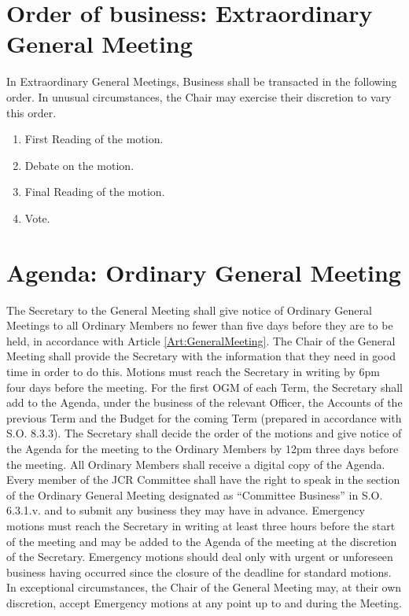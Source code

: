 \section{Order of business: Extraordinary General Meeting}
\npara In Extraordinary General Meetings, Business shall be transacted in the following order.  In unusual circumstances, the Chair may exercise their discretion to vary this order.
\begin{enumerate}
\item First Reading of the motion.
\item Debate on the motion.
\item Final Reading of the motion.
\item Vote.
\end{enumerate}
\section{Agenda: Ordinary General Meeting}
\npara The Secretary to the General Meeting shall give notice of Ordinary General Meetings to all Ordinary Members no fewer than five days before they are to be held, in accordance with Article \ref{Art:GeneralMeeting}.  The Chair of the General Meeting shall provide the Secretary with the information that they need in good time in order to do this.
\npara Motions must reach the Secretary in writing by 6pm four days before the meeting.
\npara For the first OGM of each Term, the Secretary shall add to the Agenda, under the business of the relevant Officer, the Accounts of the previous Term and the Budget for the coming Term (prepared in accordance with S.O. 8.3.3).
\npara The Secretary shall decide the order of the motions and give notice of the Agenda for the meeting to the Ordinary Members by 12pm three days before the meeting.
\npara All Ordinary Members shall receive a digital copy of the Agenda.
\npara Every member of the JCR Committee shall have the right to speak in the section of the Ordinary General Meeting designated as ``Committee Business'' in S.O. 6.3.1.v. and to submit any business they may have in advance.
\npara Emergency motions must reach the Secretary in writing at least three hours before the start of the meeting and may be added to the Agenda of the meeting at the discretion of the Secretary. Emergency motions should deal only with urgent or unforeseen business having occurred since the closure of the deadline for standard motions.
\npara In exceptional circumstances, the Chair of the General Meeting may, at their own discretion, accept Emergency motions at any point up to and during the Meeting.
